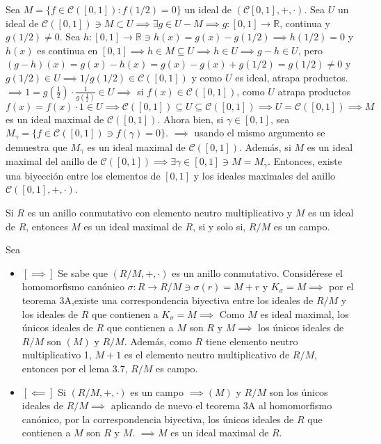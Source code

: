 \begin{ejemplo}
    Sea $M=\{f\in\mathcal{C}([0,1]):f(1/2)=0\}$ un ideal de $\left(\mathcal{C}[0,1],+,\cdot\right)$. Sea $U$ un ideal de $\mathcal{C}([0,1])\ni M\subset U\implies \exists g\in U-M\implies g:[0,1]\to \mathbb{R}$, continua y $g(1/2)\neq 0$. Sea $h:[0,1]\to\mathbb{R}\ni h(x)=g(x)-g(1/2)\implies h(1/2)=0$ y $h(x)$ es continua en $[0,1]\implies h\in M\subseteq U\implies h\in U\implies g-h\in U$, pero $(g-h)(x)=g(x)-h(x)=g(x)-g(x)+g(1/2)=g(1/2)\neq 0$ y $g(1/2)\in U\implies 1/g(1/2)\in \mathcal{C}([0,1])$ y como $U$ es ideal, atrapa productos. $\implies 1 = g\left(\frac{1}{2}\right)\cdot \frac{1}{g\left(\frac{1}{2}\right)}\in U\implies$ si $f(x)\in\mathcal{C}([0,1])$, como $U$ atrapa productos $f(x)=f(x)\cdot 1 \in U\implies \mathcal{C}([0,1])\subseteq U\subseteq \mathcal{C}([0,1])\implies U=\mathcal{C}\left([0,1]\right)\implies M$ es un ideal maximal de $\mathcal{C}\left([0,1]\right)$.  Ahora bien, si $\gamma\in [0,1]$, sea $M_\gamma =\{f\in\mathcal{C}([0,1])\ni f(\gamma)=0\}$. $\implies$ usando el mismo argumento se demuestra que $M_\gamma$ es un ideal maximal de $\mathcal{C}([0,1])$. Además, si $M$ es un ideal maximal del anillo de $\mathcal{C}([0,1])\implies \exists \gamma \in [0,1]\ni M=M_\gamma$. Entonces, existe una biyección entre los elementos de $[0,1]$ y los ideales maximales del anillo $\mathcal{C}([0,1],+,\cdot)$.

\end{ejemplo}

\begin{teorema}[3B]
    Si $R$ es un anillo conmutativo con elemento neutro multiplicativo y $M$ es un ideal de $R$, entonces $M$ es un ideal maximal de $R$, si y solo si, $R/M$ es un campo.
    \begin{dem}
        Sea 
        \begin{itemize}
            \item $[\implies]$ Se sabe que $\left(R/M,+,\cdot\right)$ es un anillo conmutativo. Considérese el homomorfismo canónico $\sigma: R\to R/M\ni \sigma(r)= M+r$ y $K_\sigma=M\implies$ por el teorema 3A,existe una correspondencia biyectiva entre los ideales de $R/M$ y los ideales de $R$ que contienen a $K_\sigma=M\implies $ Como $M$ es ideal maximal, los únicos ideales de $R$ que contienen a $M$ son $R$ y $M\implies$ los únicos ideales de $R/M$ son $(M)$ y $R/M$. Además, como $R$ tiene elemento neutro multiplicativo 1, $M+1$ es el elemento neutro multiplicativo de $R/M$, entonces por el lema 3.7, $R/M$ es campo.
            \item $[\impliedby]$ Si $(R/M, +, \cdot)$ es un campo $\implies (M)$ y $R/M$ son los únicos ideales de $R/M\implies $ aplicando de nuevo el teorema 3A al homomorfismo canónico, por la correspondencia biyectiva, los únicos ideales de $R$ que contienen a $M$ son $R$ y $M$. $\implies M$ es un ideal maximal de $R$. 
        \end{itemize}
    \end{dem}
\end{teorema}